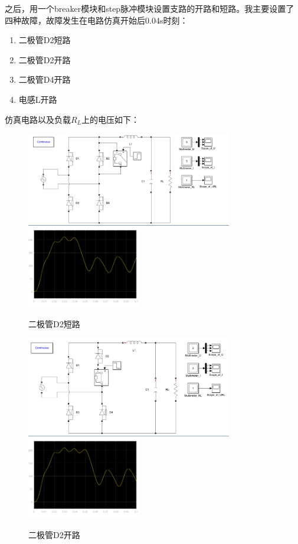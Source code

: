 \documentclass{article}
\begin{document}
	之后，用一个breaker模块和step脉冲模块设置支路的开路和短路。我主要设置了四种故障，故障发生在电路仿真开始后0.04s时刻：
	\begin{enumerate}
		\item 二极管D2短路
		\item 二极管D2开路
		\item 二极管D4开路
		\item 电感L开路
	\end{enumerate}
	
	仿真电路以及负载$R_{L}$上的电压如下：
	
	\begin{figure}[bhtp]
		\centering
		\includegraphics[width=9cm]{figure/D2_S.png}
		\quad
		\includegraphics[width=5cm]{figure/D2_S_URL.png}
		\caption{二极管D2短路}
	\end{figure}
	
	\begin{figure}[bhtp]
		\centering
		\includegraphics[width=9cm]{figure/D2_O.png}
		\quad
		\includegraphics[width=5cm]{figure/D2_O_URL.png}
		\caption{二极管D2开路}
	\end{figure}
	
\end{document}
